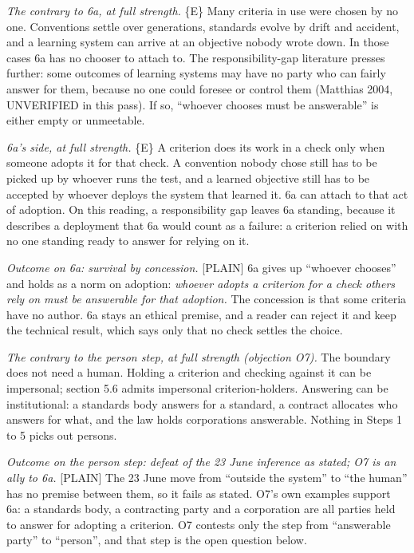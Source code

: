 \documentclass[11pt]{article}
\newcommand{\register}[1]{{\ttfamily\small #1}}
\begin{document}
\emph{The contrary to 6a, at full strength.} \{E\} Many criteria in use were chosen by no one. Conventions settle over generations, standards evolve by drift and accident, and a learning system can arrive at an objective nobody wrote down. In those cases 6a has no chooser to attach to. The responsibility-gap literature presses further: some outcomes of learning systems may have no party who can fairly answer for them, because no one could foresee or control them (Matthias 2004, UNVERIFIED in this pass). If so, ``whoever chooses must be answerable'' is either empty or unmeetable.

\emph{6a's side, at full strength.} \{E\} A criterion does its work in a check only when someone adopts it for that check. A convention nobody chose still has to be picked up by whoever runs the test, and a learned objective still has to be accepted by whoever deploys the system that learned it. 6a can attach to that act of adoption. On this reading, a responsibility gap leaves 6a standing, because it describes a deployment that 6a would count as a failure: a criterion relied on with no one standing ready to answer for relying on it.

\emph{Outcome on 6a: survival by concession.} \register{[PLAIN]} 6a gives up ``whoever chooses'' and holds as a norm on adoption: \emph{whoever adopts a criterion for a check others rely on must be answerable for that adoption.} The concession is that some criteria have no author. 6a stays an ethical premise, and a reader can reject it and keep the technical result, which says only that no check settles the choice.

\emph{The contrary to the person step, at full strength (objection O7).} The boundary does not need a human. Holding a criterion and checking against it can be impersonal; section 5.6 admits impersonal criterion-holders. Answering can be institutional: a standards body answers for a standard, a contract allocates who answers for what, and the law holds corporations answerable. Nothing in Steps 1 to 5 picks out persons.

\emph{Outcome on the person step: defeat of the 23 June inference as stated; O7 is an ally to 6a.} \register{[PLAIN]} The 23 June move from ``outside the system'' to ``the human'' has no premise between them, so it fails as stated. O7's own examples support 6a: a standards body, a contracting party and a corporation are all parties held to answer for adopting a criterion. O7 contests only the step from ``answerable party'' to ``person'', and that step is the open question below.
\end{document}
